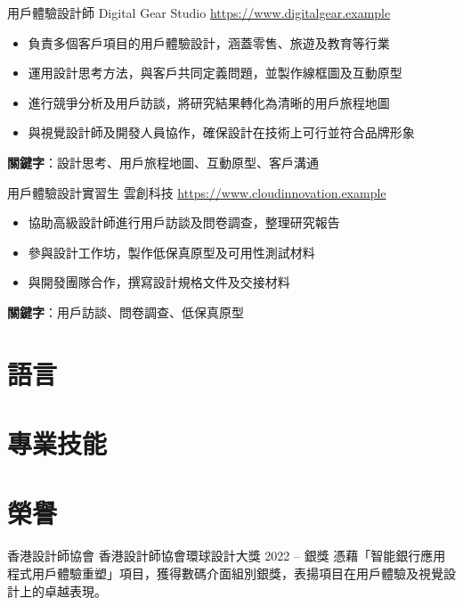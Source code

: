 \documentclass[a4paper, serif, 10pt]{moderncv}
\begin{document}
        {用戶體驗設計師}
        {Digital Gear Studio}
        {\url{https://www.digitalgear.example}}
        {}
        {\begin{itemize}
\item 負責多個客戶項目的用戶體驗設計，涵蓋零售、旅遊及教育等行業
\item 運用設計思考方法，與客戶共同定義問題，並製作線框圖及互動原型
\item 進行競爭分析及用戶訪談，將研究結果轉化為清晰的用戶旅程地圖
\item 與視覺設計師及開發人員協作，確保設計在技術上可行並符合品牌形象
\end{itemize}
\textbf{關鍵字}：設計思考、用戶旅程地圖、互動原型、客戶溝通}

        {用戶體驗設計實習生}
        {雲創科技}
        {\url{https://www.cloudinnovation.example}}
        {}
        {\begin{itemize}
\item 協助高級設計師進行用戶訪談及問卷調查，整理研究報告
\item 參與設計工作坊，製作低保真原型及可用性測試材料
\item 與開發團隊合作，撰寫設計規格文件及交接材料
\end{itemize}
\textbf{關鍵字}：用戶訪談、問卷調查、低保真原型}
\section{語言}

\section{專業技能}

\section{榮譽}

        {香港設計師協會}
        {香港設計師協會環球設計大獎 2022 – 銀獎}
        {}
        {}
        {憑藉「智能銀行應用程式用戶體驗重塑」項目，獲得數碼介面組別銀獎，表揚項目在用戶體驗及視覺設計上的卓越表現。}
\end{document}
